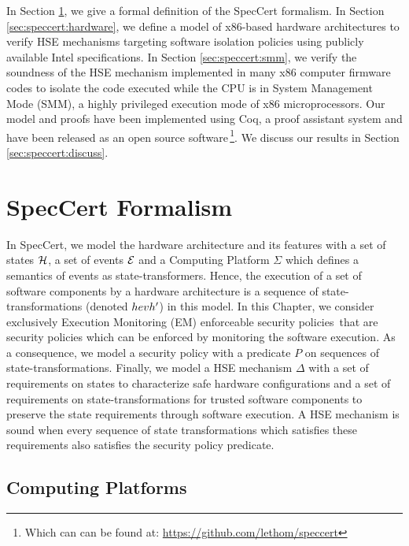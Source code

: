In Section \ref{sec:speccert:framework}, we give a formal definition of the
SpecCert formalism.
%
In Section \ref{sec:speccert:hardware}, we define a model of x86-based hardware
architectures to verify HSE mechanisms targeting software isolation policies
using publicly available Intel specifications.
%
In Section \ref{sec:speccert:smm}, we verify the soundness of the HSE mechanism
implemented in many x86 computer firmware codes to isolate the code executed
while the CPU is in System Management Mode (SMM), a highly privileged execution
mode of x86 microprocessors.
%
Our model and proofs have been implemented using Coq, a proof assistant system
and have been released as an open source software\,\footnote{Which can can be
  found at: \url{https://github.com/lethom/speccert}}.
%
We discuss our results in Section \ref{sec:speccert:discuss}.

\section{SpecCert Formalism} \label{sec:speccert:framework}

In SpecCert, we model the hardware architecture and its features with a set of
states $\mathcal{H}$, a set of events $\mathcal{E}$ and a Computing Platform $\Sigma$
which defines a semantics of events as state-transformers. Hence, the execution
of a set of software components by a hardware architecture is a sequence of
state-transformations (denoted $\transitionLTS{Ez}{h}{ev}{h'}$) in this model.
In this Chapter, we consider exclusively Execution Monitoring (EM) enforceable
security policies\,\cite{schneider2000enforceable,basin2013enforceable} that are
security policies which can be enforced by monitoring the software execution. As
a consequence, we model a security policy with a predicate $P$ on sequences of
state-transformations.  Finally, we model a HSE mechanism $\Delta$ with a set of
requirements on states to characterize safe hardware configurations and a set of
requirements on state-transformations for trusted software components to
preserve the state requirements through software execution. A HSE mechanism is
sound when every sequence of state transformations which satisfies these
requirements also satisfies the security policy predicate.

\subsection{Computing Platforms} \label{subsec:speccert:computing}

